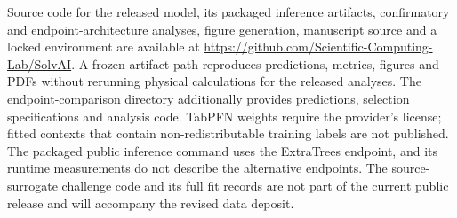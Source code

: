 \documentclass[12pt]{article}
\begin{document}
Source code for the released model, its packaged inference artifacts,
confirmatory and endpoint-architecture analyses, figure generation, manuscript
source and a locked environment are available at
\url{https://github.com/Scientific-Computing-Lab/SolvAI}. A frozen-artifact path
reproduces predictions, metrics, figures and PDFs without rerunning physical
calculations for the released analyses. The endpoint-comparison directory additionally provides predictions,
selection specifications and analysis code. TabPFN weights require the provider's
license; fitted contexts that contain non-redistributable training labels are not
published. The packaged public inference command uses the ExtraTrees endpoint,
and its runtime measurements do not describe the alternative endpoints. The
source-surrogate challenge code and its full fit records are not part of the
current public release and will accompany the revised data deposit.


\begingroup\small

\endgroup

\clearpage
\nolinenumbers
\begingroup
\graphicspath{{supplementary/figures/}}

\endgroup
\end{document}
